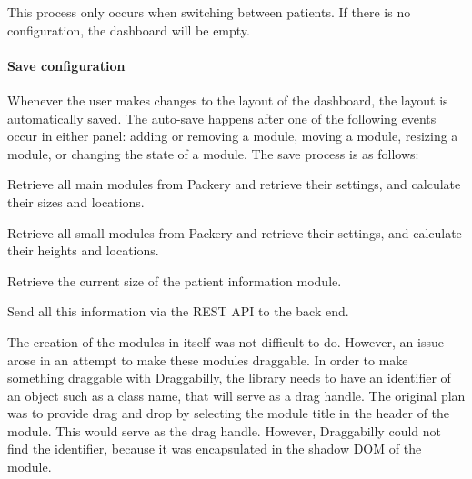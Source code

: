             \noindent This process only occurs when switching between patients. If there is no configuration, the dashboard will be empty.

            \paragraph{Save configuration} Whenever the user makes changes to the layout of the dashboard, the layout is automatically saved. The auto-save happens after one of the following events occur in either panel: adding or removing a module, moving a module, resizing a module, or changing the state of a module. The save process is as follows:
            \vspace{-6pt}
            \begin{myenumerate}
                \item Retrieve all main modules from Packery and retrieve their settings, and calculate their sizes and locations.
                \item Retrieve all small modules from Packery and retrieve their settings, and calculate their heights and locations.
                \item Retrieve the current size of the patient information module.
                \item Send all this information via the REST API to the back end.
            \end{myenumerate}


            The creation of the modules in itself was not difficult to do. However, an issue arose in an attempt to make these modules draggable. In order to make something draggable with Draggabilly, the library needs to have an identifier of an object such as a class name, that will serve as a drag handle. The original plan was to provide drag and drop by selecting the module title in the header of the module. This would serve as the drag handle. However, Draggabilly could not find the identifier, because it was encapsulated in the shadow DOM of the module.

